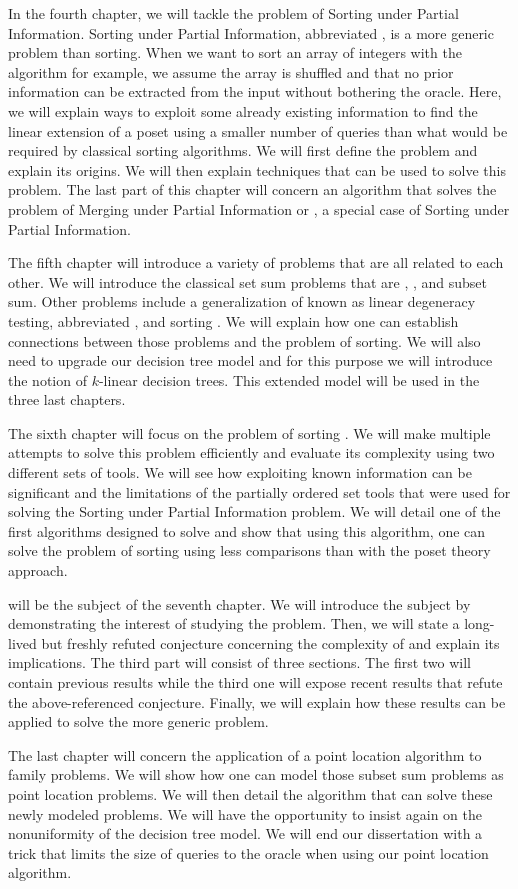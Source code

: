 In the fourth chapter, we will tackle the problem of Sorting under Partial
Information. Sorting under Partial Information, abbreviated , is
a more generic problem than sorting. When we want to sort an array of integers
with the \quicksort algorithm for example, we assume the array is shuffled and
that no prior information can be extracted from the input without bothering the
oracle. Here, we will explain ways to exploit some already existing information
to find the linear extension of a poset using a smaller number of queries than
what would be required by classical sorting algorithms. We will first define
the problem and explain its origins. We will then explain techniques that can
be used to solve this problem. The last part of this chapter will concern an
algorithm that solves the problem of Merging under Partial Information or
, a special case of Sorting under Partial Information.

The fifth chapter will introduce a variety of problems that are all related to
each other. We will introduce the classical set sum problems that are
\threeSUM, \kSUM, and subset sum. Other problems include a generalization of
\kSUM known as linear degeneracy testing, abbreviated \kLDT, and sorting \XY.
We will explain how one can establish connections between those problems and the problem
of sorting. We will also need to upgrade our decision tree model and for this
purpose we will introduce the notion of \(k\)-linear decision trees. This
extended model will be used in the three last chapters.

The sixth chapter will focus on the problem of sorting \XY. We will make
multiple attempts to solve this problem efficiently and evaluate its complexity
using two different sets of tools. We will see how exploiting known information
can be significant and the limitations of the partially ordered set tools that
were used for solving the Sorting under Partial Information problem. We will
detail one of the first algorithms designed to solve  and
show that using this algorithm, one can solve the problem of sorting \XY
using less comparisons than with the poset theory approach.

\threeSUM will be the subject of the seventh chapter. We will introduce the
subject by demonstrating the interest of studying the \threeSUM problem. Then,
we will state a long-lived but freshly refuted conjecture concerning the
complexity of \threeSUM and explain its implications. The third part will
consist of three sections. The first two will contain previous results while
the third one will expose recent results that refute the above-referenced
conjecture. Finally, we will explain how these results can be applied to solve
the more generic \kLDT problem.

The last chapter will concern the application of a point location algorithm to
\kSUM family problems. We will show how one can model those subset sum
problems as point location problems. We will then detail the algorithm that
can solve these newly modeled problems. We will have the opportunity to insist again
on the nonuniformity of the decision tree model. We will end our dissertation
with a trick that limits the size of queries to the oracle when
using our point location algorithm.
